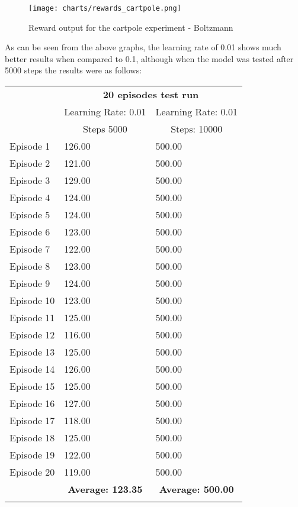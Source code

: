 \begin{figure}[H]
    \centering
    \texttt{[image: charts/rewards\_cartpole.png]}
    \caption{Reward output for the cartpole experiment - Boltzmann }
    \end{figure}

As can be seen from the above graphs, the learning rate of 0.01 shows much better results when compared to 0.1, although when the model was tested after 5000 steps the results were as follows:
\begin{table}[H]
    \begin{tabular}{ |p{2.2cm}|p{3cm}|p{3cm}| }
        \cline{2-3} 
        \multicolumn{1}{c}{} & \multicolumn{2}{|c|}{\Large \textbf{20 episodes test run}} \\
        \cline{2-3} 
        \multicolumn{1}{c}{} & \multicolumn{1}{|c|}{Learning Rate: 0.01} & \multicolumn{1}{|c|}{Learning Rate: 0.01}\\
        \multicolumn{1}{c}{} & \multicolumn{1}{|c|}{Steps 5000} & \multicolumn{1}{|c|}{Steps: 10000}\\
        \hline
        Episode 1 & 126.00  & 500.00\\
        Episode 2 & 121.00  & 500.00\\
        Episode 3 & 129.00  & 500.00\\
        Episode 4 & 124.00  & 500.00\\
        Episode 5 & 124.00  & 500.00\\
        Episode 6 & 123.00  & 500.00\\
        Episode 7 & 122.00  & 500.00\\
        Episode 8 & 123.00  & 500.00\\
        Episode 9 & 124.00  & 500.00\\
        Episode 10 & 123.00  &500.00 \\
        Episode 11 & 125.00  &500.00 \\
        Episode 12 & 116.00  &500.00 \\
        Episode 13 & 125.00  &500.00 \\
        Episode 14 & 126.00  &500.00 \\
        Episode 15 & 125.00  &500.00 \\
        Episode 16 & 127.00  &500.00 \\
        Episode 17 & 118.00  &500.00 \\
        Episode 18 & 125.00  &500.00 \\
        Episode 19 & 122.00  &500.00 \\
        Episode 20 & 119.00  &500.00 \\
        \hline
        \multicolumn{1}{c}{} & \multicolumn{1}{|c|}{\textbf{Average: 123.35}} & \multicolumn{1}{|c|}{\textbf{Average: 500.00}} \\
        \cline{2-3}
        \multicolumn{3}{c}{} 
    \end{tabular}
\end{table}
   
